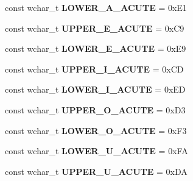 \begin{DoxyCompactItemize}
\item 
\hypertarget{group___indexing_ga33013dda0d3a80f92d5761d7feb6b049}{const wchar\-\_\-t {\bfseries L\-O\-W\-E\-R\-\_\-\-A\-\_\-\-A\-C\-U\-T\-E} = 0x\-E1}\label{group___indexing_ga33013dda0d3a80f92d5761d7feb6b049}

\item 
\hypertarget{group___indexing_gae047dd18d206e1d8952572edc413043d}{const wchar\-\_\-t {\bfseries U\-P\-P\-E\-R\-\_\-\-E\-\_\-\-A\-C\-U\-T\-E} = 0x\-C9}\label{group___indexing_gae047dd18d206e1d8952572edc413043d}

\item 
\hypertarget{group___indexing_ga17d68cd5bb4adb01bbe928e64243b5a5}{const wchar\-\_\-t {\bfseries L\-O\-W\-E\-R\-\_\-\-E\-\_\-\-A\-C\-U\-T\-E} = 0x\-E9}\label{group___indexing_ga17d68cd5bb4adb01bbe928e64243b5a5}

\item 
\hypertarget{group___indexing_ga5e11641256e1422d64da026565a27491}{const wchar\-\_\-t {\bfseries U\-P\-P\-E\-R\-\_\-\-I\-\_\-\-A\-C\-U\-T\-E} = 0x\-C\-D}\label{group___indexing_ga5e11641256e1422d64da026565a27491}

\item 
\hypertarget{group___indexing_ga9f74714686d0af143e46579ef04f8e54}{const wchar\-\_\-t {\bfseries L\-O\-W\-E\-R\-\_\-\-I\-\_\-\-A\-C\-U\-T\-E} = 0x\-E\-D}\label{group___indexing_ga9f74714686d0af143e46579ef04f8e54}

\item 
\hypertarget{group___indexing_gac90440fb63d7a53aca7727ec846f7e77}{const wchar\-\_\-t {\bfseries U\-P\-P\-E\-R\-\_\-\-O\-\_\-\-A\-C\-U\-T\-E} = 0x\-D3}\label{group___indexing_gac90440fb63d7a53aca7727ec846f7e77}

\item 
\hypertarget{group___indexing_ga36fa07e6a4483a1b72f720434fa4cc3b}{const wchar\-\_\-t {\bfseries L\-O\-W\-E\-R\-\_\-\-O\-\_\-\-A\-C\-U\-T\-E} = 0x\-F3}\label{group___indexing_ga36fa07e6a4483a1b72f720434fa4cc3b}

\item 
\hypertarget{group___indexing_ga7990e23dc8b274721e95d514b132e527}{const wchar\-\_\-t {\bfseries L\-O\-W\-E\-R\-\_\-\-U\-\_\-\-A\-C\-U\-T\-E} = 0x\-F\-A}\label{group___indexing_ga7990e23dc8b274721e95d514b132e527}

\item 
\hypertarget{group___indexing_gae54aa538d9d07f6f25a8f73d8eb2833b}{const wchar\-\_\-t {\bfseries U\-P\-P\-E\-R\-\_\-\-U\-\_\-\-A\-C\-U\-T\-E} = 0x\-D\-A}\label{group___indexing_gae54aa538d9d07f6f25a8f73d8eb2833b}


\end{DoxyCompactItemize}
